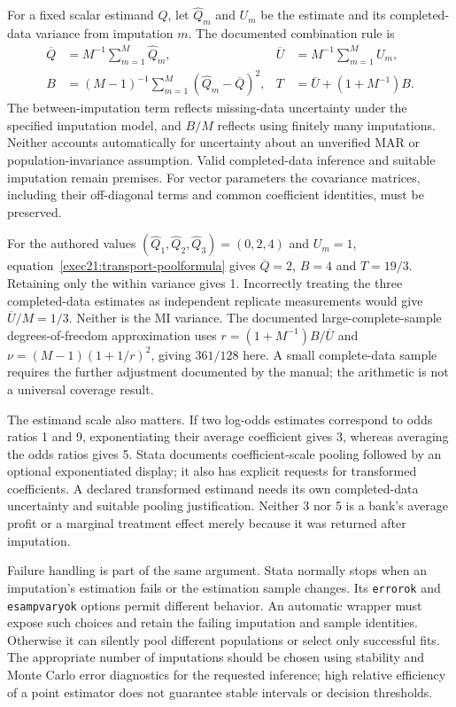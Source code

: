 For a fixed scalar estimand $Q$, let $\widehat Q_m$ and $U_m$ be the estimate
and its completed-data variance from imputation $m$. The documented combination
rule is
\begin{align}
 \overline Q&=M^{-1}\sum_{m=1}^M\widehat Q_m,&
 \overline U&=M^{-1}\sum_{m=1}^M U_m,\nonumber\\
 B&=(M-1)^{-1}\sum_{m=1}^M(\widehat Q_m-\overline Q)^2,&
 T&=\overline U+(1+M^{-1})B.
 \label{exec21:transport-poolformula}
\end{align}
The between-imputation term reflects missing-data uncertainty under the
specified imputation model, and $B/M$ reflects using finitely many imputations.
Neither accounts automatically for uncertainty about an unverified MAR or
population-invariance assumption. Valid completed-data inference and suitable
imputation remain premises. For vector parameters the covariance matrices,
including their off-diagonal terms and common coefficient identities, must be
preserved. \citep{exec21_transport_stata_estimate,exec21_transport_stata_substantive}

For the authored values $(\widehat Q_1,\widehat Q_2,\widehat Q_3)=(0,2,4)$
and $U_m=1$, equation~\eqref{exec21:transport-poolformula} gives
$\overline Q=2$, $B=4$ and $T=19/3$. Retaining only the within variance gives
1. Incorrectly treating the three completed-data estimates as independent
replicate measurements would give $\overline U/M=1/3$. Neither is the MI
variance. The documented large-complete-sample degrees-of-freedom approximation
uses $r=(1+M^{-1})B/\overline U$ and
$\nu=(M-1)(1+1/r)^2$, giving $361/128$ here. A small complete-data sample
requires the further adjustment documented by the manual; the arithmetic is
not a universal coverage result. \citep{exec21_transport_stata_estimate,exec21_transport_reference}

The estimand scale also matters. If two log-odds estimates correspond to odds
ratios 1 and 9, exponentiating their average coefficient gives 3, whereas
averaging the odds ratios gives 5. Stata documents coefficient-scale pooling
followed by an optional exponentiated display; it also has explicit requests
for transformed coefficients. A declared transformed estimand needs its own
completed-data uncertainty and suitable pooling justification. Neither 3 nor
5 is a bank's average profit or a marginal treatment effect merely because it
was returned after imputation. \citep{exec21_transport_stata_estimate,exec21_transport_reference}

Failure handling is part of the same argument. Stata normally stops when an
imputation's estimation fails or the estimation sample changes. Its
\texttt{errorok} and \texttt{esampvaryok} options permit different behavior.
An automatic wrapper must expose such choices and retain the failing
imputation and sample identities. Otherwise it can silently pool different
populations or select only successful fits. The appropriate number of
imputations should be chosen using stability and Monte Carlo error diagnostics
for the requested inference; high relative efficiency of a point estimator
does not guarantee stable intervals or decision thresholds.
\citep{exec21_transport_stata_estimate,exec21_transport_sas_mi_intro}

